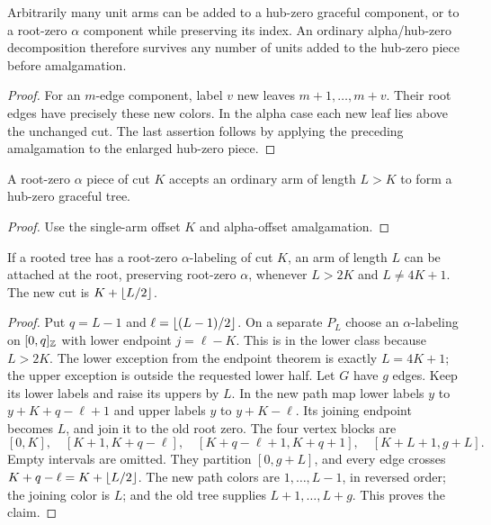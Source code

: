 \begin{lemma}\label{common:unit-stability}
Arbitrarily many unit arms can be added to a hub-zero graceful
component, or to a root-zero $\alpha$ component while preserving its
index. An ordinary alpha/hub-zero decomposition therefore survives
any number of units added to the hub-zero piece before amalgamation.
\end{lemma}
\begin{proof}
For an $m$-edge component, label $v$ new leaves $m+1,\ldots,m+v$.
Their root edges have precisely these new colors. In the alpha case
each new leaf lies above the unchanged cut. The last assertion follows
by applying the preceding amalgamation to the enlarged hub-zero piece.
\end{proof}

\begin{corollary}\label{common:ordinary-attachment}
A root-zero $\alpha$ piece of cut $K$ accepts an ordinary arm of
length $L>K$ to form a hub-zero graceful tree.
\end{corollary}
\begin{proof}
Use the single-arm offset $K$ and alpha-offset amalgamation.
\end{proof}

\begin{lemma}\label{common:alpha-extension}
If a rooted tree has a root-zero $\alpha$-labeling of cut $K$, an
arm of length $L$ can be attached at the root, preserving root-zero
$\alpha$, whenever $L>2K$ and $L\ne4K+1$. The new cut is
$K+\left\lfloor L/2\right\rfloor$.
\end{lemma}
\begin{proof}
Put $q=L-1$ and $\ell=\left\lfloor (L-1)/2\right\rfloor$. On a separate $P_L$ choose
an $\alpha$-labeling on $[0,q]_{\mathbb Z}$ with lower endpoint
$j=\ell-K$. This is in the lower class because $L>2K$. The lower
exception from the endpoint theorem is exactly $L=4K+1$; the upper
exception is outside the requested lower half. Let $G$ have $g$ edges.
Keep its lower labels and raise its uppers by $L$. In the new path
map lower labels $y$ to $y+K+q-\ell+1$ and upper labels $y$ to
$y+K-\ell$. Its joining endpoint becomes $L$, and join it to the
old root zero. The four vertex blocks are
\[
 [0,K],\quad[K+1,K+q-\ell],\quad
 [K+q-\ell+1,K+q+1],\quad[K+L+1,g+L].
\]
Empty intervals are omitted. They partition $[0,g+L]$, and every
edge crosses $K+q-\ell=K+\left\lfloor L/2\right\rfloor$. The new path colors are
$1,\ldots,L-1$, in reversed order; the joining color is $L$; and
the old tree supplies $L+1,\ldots,L+g$. This proves the claim.
\end{proof}

